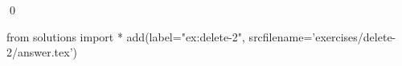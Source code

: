 
\begin{ex} 
  \label{ex:delete-2}
  
  \qed
\end{ex} 
\begin{python0}
from solutions import *
add(label="ex:delete-2",
    srcfilename='exercises/delete-2/answer.tex') 
\end{python0}
